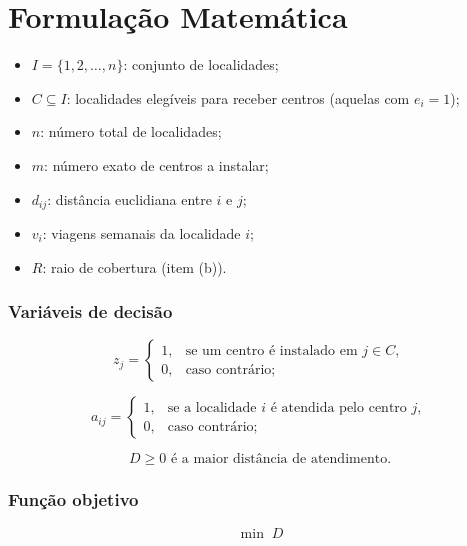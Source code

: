 \documentclass[12pt,a4paper]{article}
\begin{document}
\section{Formulação Matemática}

\begin{itemize}
    \item $I = \{1,2,\ldots,n\}$: conjunto de localidades;
    \item $C \subseteq I$: localidades elegíveis para receber
    centros (aquelas com $e_i = 1$);
    \item $n$: número total de localidades;
    \item $m$: número exato de centros a instalar;
    \item $d_{ij}$: distância euclidiana entre $i$ e $j$;
    \item $v_i$: viagens semanais da localidade $i$;
    \item $R$: raio de cobertura (item (b)).
\end{itemize}

\subsubsection*{Variáveis de decisão}

\begin{equation}
z_j = \begin{cases}
1, & \text{se um centro é instalado em } j \in C,\\
0, & \text{caso contrário;}
\end{cases}
\end{equation}

\begin{equation}
a_{ij} = \begin{cases}
1, & \text{se a localidade } i \text{ é atendida pelo centro } j,\\
0, & \text{caso contrário;}
\end{cases}
\end{equation}

\begin{equation}
D \ge 0 \text{ é a maior distância de atendimento.}
\end{equation}

\subsubsection*{Função objetivo}

\begin{equation}
\boxed{\min \; D}
\end{equation}
\end{document}
